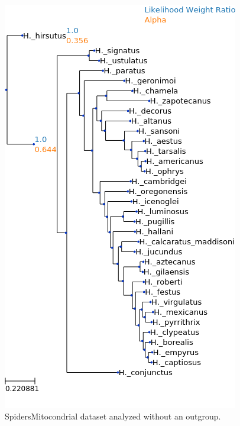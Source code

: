 \documentclass{article}
\begin{document}
\begin{figure}
  \begin{center}
    \includegraphics[width=.75\linewidth]{figs/spiders/mito_no_outgroup_lwr.png}
    \caption{SpidersMitocondrial dataset analyzed without an outgroup.}
    \label{fig:spiders-mito-no-outgroup}
  \end{center}
\end{figure}
\end{document}
